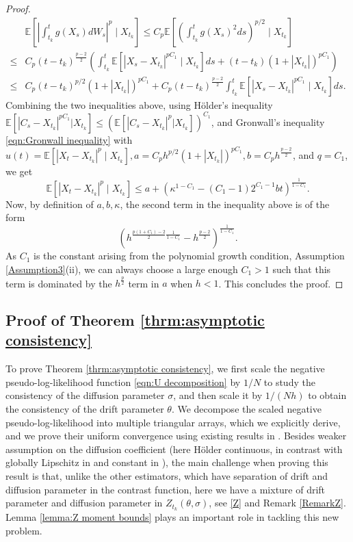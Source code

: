 \documentclass[a4paper,12pt]{article}
\numberwithin{equation}{section}
\theoremstyle{plain}
\theoremstyle{definition}
\begin{document}
\begin{appendix}
\begin{proof}
    \begin{align*}
        &\mathbb{E}\left[\left|\int_{t_k}^t g(X_s)dW_s\right|^p\mid X_{t_k}\right]\leq C_p\mathbb{E}\left[\left(\int_{t_k}^t g(X_s)^2 ds\right)^{p/2}\mid X_{t_k}\right]\\
        \leq& C_p(t-t_k)^{\frac{p-2}{2}}\left(\int_{t_k}^t \mathbb{E}\left[|X_s-X_{t_k}|^{pC_1}\mid X_{t_k}\right]ds+(t-t_k)(1+|X_{t_k}|)^{pC_1}\right)\\
        \leq& C_p(t-t_k)^{p/2}(1+|X_{t_k}|)^{pC_1}+C_p(t-t_k)^{\frac{p-2}{2}}\int_{t_k}^t \mathbb{E}\left[|X_s-X_{t_k}|^{pC_1}\mid X_{t_k}\right]ds.
    \end{align*}
    Combining the two inequalities above, using H\"older's inequality  $\mathbb{E}[|C_s-X_{t_k}|^{pC_1}|X_{t_k}]\leq (\mathbb{E}[|C_s-X_{t_k}|^{p}|X_{t_k}])^{C_1}$, and Gronwall's inequality \eqref{eqn:Gronwall inequality} with
$u(t)=\mathbb{E}\left[\left|X_t-X_{t_k}\right|^p\mid X_{t_k}\right] , a=C_ph^{p/2}(1+|X_{t_k}|)^{pC_1}, b=C_ph^{\frac{p-2}{2}}$, and $q=C_1$, we get
\[
\mathbb{E}\left[\left|X_t-X_{t_k}\right|^p\mid X_{t_k}\right]\leq a+(\kappa^{1-C_1}-(C_1-1)2^{C_1-1}bt)^{\frac{1}{1-C_1}}.
\]
    Now, by definition of $a,b,\kappa$, the second term in the inequality above is of the form
    \begin{equation*}
        \left(h^{\frac{p(1+C_1)-2}{2}\frac{1}{1-C_1}}-h^{\frac{p-2}{2}}\right)^{\frac{1}{1-C_1}}.
    \end{equation*}
    As $C_1$ is the constant arising from the polynomial growth condition, Assumption \ref{Assumption3}(ii), we can always choose a large enough $C_1>1$ such that this term is dominated by the $h^{\frac{p}{2}}$ term in $a$ when $h<1$. This concludes the proof. 
    \end{proof}
\subsection{Proof of Theorem \ref{thrm:asymptotic consistency}}\label{ProofTheorem5.2}
To prove Theorem \ref{thrm:asymptotic consistency}, 
we first scale the negative pseudo-log-likelihood function \eqref{eqn:U decomposition}
by $1/N$ to study the consistency of the diffusion parameter $\sigma$, and then scale it by $1/(Nh)$ to obtain the consistency of the drift parameter $\theta$. We decompose the scaled negative pseudo-log-likelihood into multiple triangular arrays, which we explicitly derive, and we prove their uniform convergence using existing results in \cite{jacod_estimation_1993,gloter2006parameter,yoshida1990asymptotic}. Besides weaker assumption on the diffusion coefficient (here H\"older continuous, in contrast with globally Lipschitz in \cite{kessler_estimation_1997} and constant in \cite{pilipovic_parameter_2024}), the main challenge when proving this result  is that, unlike the other estimators, which have separation of drift and diffusion parameter in the contrast function, here we have a mixture of drift parameter and diffusion parameter in $Z_{t_k}(\theta,\sigma)$, see \eqref{Z} and Remark \ref{RemarkZ}. Lemma \ref{lemma:Z moment bounds} plays an important role in tackling this new problem. 


\end{appendix}
\end{document}
